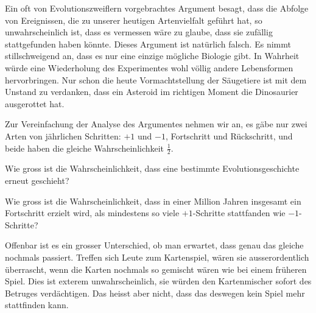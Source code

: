 Ein oft von Evolutionszweiflern vorgebrachtes Argument besagt, dass
die Abfolge von Ereignissen, die zu unserer heutigen Artenvielfalt
geführt hat, so unwahrscheinlich ist, dass es vermessen wäre zu
glaube, dass sie zufällig stattgefunden haben könnte. Dieses Argument
ist natürlich falsch. Es nimmt stillschweigend an, dass es nur eine
einzige mögliche Biologie gibt. In Wahrheit würde eine Wiederholung des
Experimentes wohl völlig andere Lebensformen hervorbringen. Nur schon
die heute Vormachtstellung der Säugetiere ist mit dem Unstand zu
verdanken, dass ein Asteroid im richtigen Moment die Dinosaurier
ausgerottet hat.

Zur Vereinfachung der Analyse des Argumentes nehmen wir an, es gäbe nur
zwei Arten von jährlichen Schritten: $+1$ und $-1$, Fortschritt und
Rückschritt,
und beide haben die gleiche Wahrscheinlichkeit $\frac12$.
\begin{teilaufgaben}
\item
Wie gross ist
die Wahrscheinlichkeit, dass eine bestimmte Evolutionsgeschichte erneut
geschieht?
\item Wie gross ist die Wahrscheinlichkeit, dass in einer Million
Jahren insgesamt ein Fortschritt erzielt wird, als mindestens so viele $+1$-Schritte stattfanden wie $-1$-Schritte?
\end{teilaufgaben}

Offenbar ist es ein grosser Unterschied, ob man erwartet, dass genau
das gleiche nochmals passiert. Treffen sich Leute zum Kartenspiel,
wären sie ausserordentlich überrascht, wenn die Karten nochmals so
gemischt wären wie bei einem früheren Spiel. Dies ist exterem
unwahrscheinlich, sie würden den Kartenmischer sofort des Betruges
verdächtigen. Das heisst aber nicht, dass das deswegen kein Spiel mehr
stattfinden kann.

